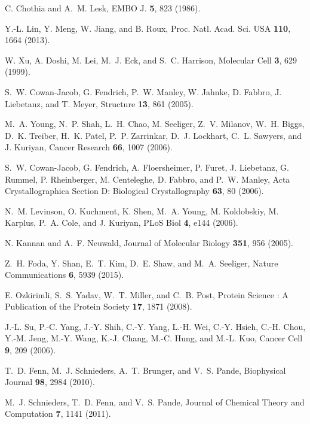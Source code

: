 \documentclass[aps,prl,preprint,nofootinbib,superscriptaddress,linenumbers]{revtex4-1}
\begin{document}
\begin{thebibliography}{100}
C. Chothia and A.~M. Lesk, EMBO J. {\bf 5},  823  (1986).

Y.-L. Lin, Y. Meng, W. Jiang, and B. Roux, Proc. Natl. Acad. Sci. USA {\bf
  110},  1664  (2013).

W. Xu, A. Doshi, M. Lei, M.~J. Eck, and S.~C. Harrison, Molecular Cell {\bf 3},
   629  (1999).

S.~W. Cowan-Jacob, G. Fendrich, P.~W. Manley, W. Jahnke, D. Fabbro, J.
  Liebetanz, and T. Meyer, Structure {\bf 13},  861  (2005).

M.~A. Young, N.~P. Shah, L.~H. Chao, M. Seeliger, Z.~V. Milanov, W.~H. Biggs,
  D.~K. Treiber, H.~K. Patel, P.~P. Zarrinkar, D.~J. Lockhart, C.~L. Sawyers,
  and J. Kuriyan, Cancer Research {\bf 66},  1007  (2006).

S.~W. Cowan-Jacob, G. Fendrich, A. Floersheimer, P. Furet, J. Liebetanz, G.
  Rummel, P. Rheinberger, M. Centeleghe, D. Fabbro, and P.~W. Manley, Acta
  Crystallographica Section D: Biological Crystallography {\bf 63},  80
  (2006).

N.~M. Levinson, O. Kuchment, K. Shen, M.~A. Young, M. Koldobskiy, M. Karplus,
  P.~A. Cole, and J. Kuriyan, PLoS Biol {\bf 4},  e144  (2006).

N. Kannan and A.~F. Neuwald, Journal of Molecular Biology {\bf 351},  956
  (2005).

Z.~H. Foda, Y. Shan, E.~T. Kim, D.~E. Shaw, and M.~A. Seeliger, Nature
  Communications {\bf 6},  5939  (2015).

E. Ozkirimli, S.~S. Yadav, W.~T. Miller, and C.~B. Post, Protein Science : A
  Publication of the Protein Society {\bf 17},  1871  (2008).

J.-L. Su, P.-C. Yang, J.-Y. Shih, C.-Y. Yang, L.-H. Wei, C.-Y. Hsieh, C.-H.
  Chou, Y.-M. Jeng, M.-Y. Wang, K.-J. Chang, M.-C. Hung, and M.-L. Kuo, Cancer
  Cell {\bf 9},  209  (2006).

T.~D. Fenn, M.~J. Schnieders, A.~T. Brunger, and V.~S. Pande, Biophysical
  Journal {\bf 98},  2984  (2010).

M.~J. Schnieders, T.~D. Fenn, and V.~S. Pande, Journal of Chemical Theory and
  Computation {\bf 7},  1141  (2011).


\end{thebibliography}
\end{document}
